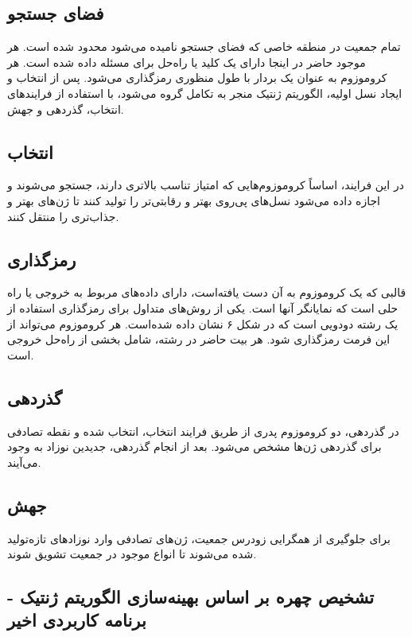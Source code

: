 \documentclass{CSICC2020}
\begin{document}
\subsection{ فضای جستجو}
 تمام جمعیت در منطقه خاصی که فضای جستجو نامیده می‌شود محدود شده است. هر موجود حاضر در اینجا دارای یک کلید یا راه‌حل برای مسئله داده شده است. هر کروموزوم به عنوان یک بردار با طول منظوری رمزگذاری می‌شود. پس از انتخاب و ایجاد نسل اولیه، الگوریتم ژنتیک منجر به تکامل گروه می‌شود، با استفاده از فرایندهای انتخاب، گذردهی و جهش. 

\subsection{انتخاب }
در این فرایند، اساساً کروموزوم‌هایی که امتیاز تناسب بالاتری دارند، جستجو می‌شوند و اجازه داده می‌شود نسل‌های پی‌روی بهتر و رقابتی‌تر را تولید کنند تا ژن‌های بهتر و جذاب‌تری را منتقل کنند. 

\subsection{رمزگذاری}
 قالبی که یک کروموزوم به آن دست یافته‌است، دارای داده‌های مربوط به خروجی یا راه حلی است که نمایانگر آنها است. یکی از روش‌های متداول برای رمزگذاری استفاده از یک رشته دودویی است که در شکل ۶ نشان داده شده‌است. هر کروموزوم می‌تواند از این فرمت رمزگذاری شود. هر بیت حاضر در رشته، شامل بخشی از راه‌حل خروجی است.

\subsection{گذردهی}
 در گذردهی، دو کروموزوم پدری از طریق فرایند انتخاب، انتخاب شده و نقطه تصادفی برای گذردهی ژن‌ها مشخص می‌شود. بعد از انجام گذردهی، جدیدین نوزاد به وجود می‌آیند.

\subsection{جهش}
 برای جلوگیری از همگرایی زودرس جمعیت، ژن‌های تصادفی وارد نوزاد‌های تازه‌تولید شده می‌شوند تا انواع موجود در جمعیت تشویق شوند.

\subsection{ تشخیص چهره بر اساس بهینه‌سازی الگوریتم ژنتیک - برنامه کاربردی اخیر }
\end{document}
